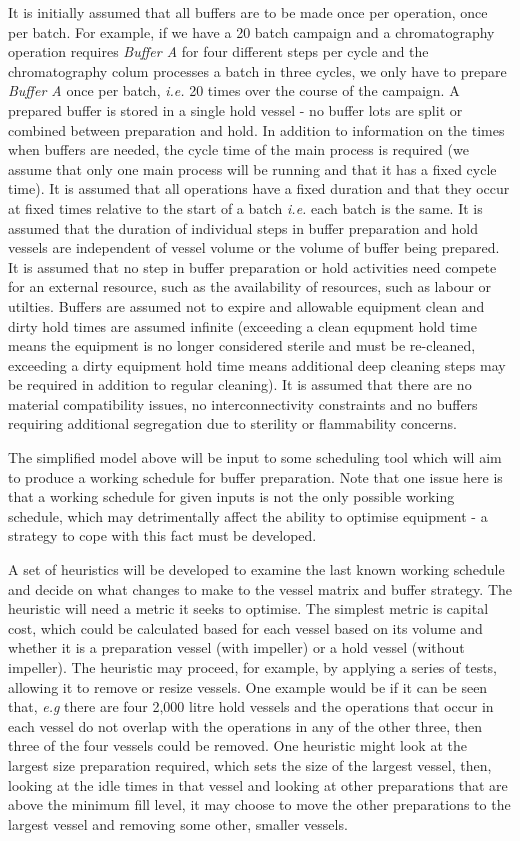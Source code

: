 It is initially assumed that all buffers are to be made once per operation, once
per batch.  For example, if we have a 20 batch campaign and a chromatography
operation requires \emph{Buffer A} for four different steps per cycle and the
chromatography colum processes a batch in three cycles, we only have to prepare
\emph{Buffer A} once per batch, \emph{i.e.} 20 times over the course of the 
campaign. A prepared buffer is stored in a single hold vessel - no buffer lots
are split or combined between preparation and hold.
In addition to information on the times when buffers are needed, the cycle time
of the main process is required (we assume that only one main process will be
running and that it has a fixed cycle time).  It is assumed that all operations
have a fixed duration and that they occur at fixed times relative to the start
of a batch \emph{i.e.} each batch is the same.  It is assumed that the
duration of individual steps in buffer preparation and hold vessels are 
independent of vessel volume or the volume of buffer being prepared.  
It is assumed that no step in buffer preparation or hold activities need compete
for an external resource, such as the availability of resources, such as labour
or utilties.  Buffers are assumed not to expire and allowable equipment clean 
and dirty hold times are assumed infinite (exceeding a clean equpment hold time
means the equipment is no longer considered sterile and must be re-cleaned,
exceeding a dirty equipment hold time means additional deep cleaning steps may
be required in addition to regular cleaning).  It is assumed that there are
no material compatibility issues, no interconnectivity constraints and no
buffers requiring additional segregation due to sterility or flammability
concerns.

The simplified model above will be input to some scheduling tool which will
aim to produce a working schedule for buffer preparation.  Note that one issue
here is that a working schedule for given inputs is not the only possible 
working schedule, which may detrimentally affect the ability to optimise
equipment - a strategy to cope with this fact must be developed.

A set of heuristics will be developed to examine the last known working schedule
and decide on what changes to make to the vessel matrix and buffer strategy.
The heuristic will need a metric it seeks to optimise. The simplest metric is
capital cost, which could be calculated based for each vessel based on its
volume and whether it is a preparation vessel (with impeller) or a hold vessel
(without impeller).  The heuristic may proceed, for example, by applying a
series of tests, allowing it to remove or resize vessels. One example would be 
if it can be seen that, \emph{e.g} there are four 2,000 litre hold vessels and
the operations that occur in each vessel do not overlap with the operations in
any of the other three, then three of the four vessels could be removed.
One heuristic might look at the largest size preparation required, which sets
the size of the largest vessel, then, looking at the idle times in that vessel
and looking at other preparations that are above the minimum fill level, it may
choose to move the other preparations to the largest vessel and removing some
other, smaller vessels.

